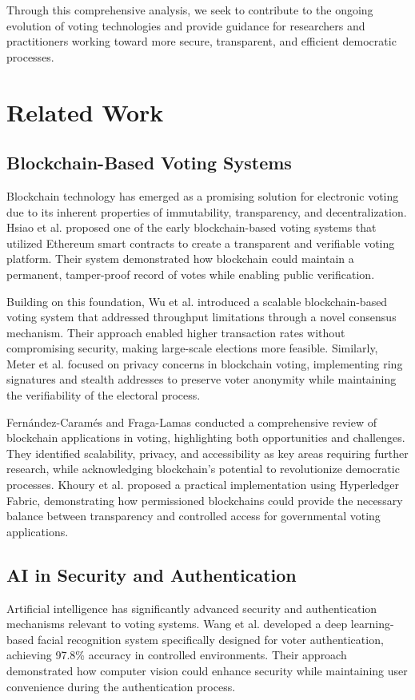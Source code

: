 \documentclass[conference]{IEEEtran}
\begin{document}
Through this comprehensive analysis, we seek to contribute to the ongoing evolution of voting technologies and provide guidance for researchers and practitioners working toward more secure, transparent, and efficient democratic processes.

\section{Related Work}
\subsection{Blockchain-Based Voting Systems}
Blockchain technology has emerged as a promising solution for electronic voting due to its inherent properties of immutability, transparency, and decentralization. Hsiao et al. \cite{b6} proposed one of the early blockchain-based voting systems that utilized Ethereum smart contracts to create a transparent and verifiable voting platform. Their system demonstrated how blockchain could maintain a permanent, tamper-proof record of votes while enabling public verification.

Building on this foundation, Wu et al. \cite{b7} introduced a scalable blockchain-based voting system that addressed throughput limitations through a novel consensus mechanism. Their approach enabled higher transaction rates without compromising security, making large-scale elections more feasible. Similarly, Meter et al. \cite{b8} focused on privacy concerns in blockchain voting, implementing ring signatures and stealth addresses to preserve voter anonymity while maintaining the verifiability of the electoral process.

Fernández-Caramés and Fraga-Lamas \cite{b9} conducted a comprehensive review of blockchain applications in voting, highlighting both opportunities and challenges. They identified scalability, privacy, and accessibility as key areas requiring further research, while acknowledging blockchain's potential to revolutionize democratic processes. Khoury et al. \cite{b10} proposed a practical implementation using Hyperledger Fabric, demonstrating how permissioned blockchains could provide the necessary balance between transparency and controlled access for governmental voting applications.

\subsection{AI in Security and Authentication}
Artificial intelligence has significantly advanced security and authentication mechanisms relevant to voting systems. Wang et al. \cite{b11} developed a deep learning-based facial recognition system specifically designed for voter authentication, achieving 97.8\% accuracy in controlled environments. Their approach demonstrated how computer vision could enhance security while maintaining user convenience during the authentication process.
\end{document}

